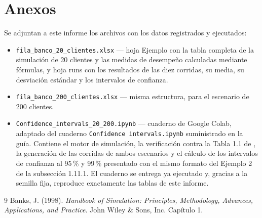 \documentclass[11pt,letterpaper]{article}
\begin{document}
\section{Anexos}

Se adjuntan a este informe los archivos con los datos registrados y ejecutados:

\begin{itemize}[itemsep=3pt]
    \item \texttt{fila\_banco\_20\_clientes.xlsx} --- hoja \guillemotleft Ejemplo\guillemotright{} con la tabla completa de la simulación de 20 clientes y las medidas de desempeño calculadas mediante fórmulas, y hoja  runs\guillemotright{} con los resultados de las diez corridas, su media, su desviación estándar y los intervalos de confianza.
    \item \texttt{fila\_banco\_200\_clientes.xlsx} --- misma estructura, para el escenario de 200 clientes.
    \item \texttt{Confidence\_intervals\_20\_200.ipynb} --- cuaderno de Google Colab, adaptado del cuaderno \texttt{Confidence intervals.ipynb} suministrado en la guía. Contiene el motor de simulación, la verificación contra la Tabla 1.1 de \cite{Banks1998}, la generación de las corridas de ambos escenarios y el cálculo de los intervalos de confianza al 95\,\% y 99\,\% presentado con el mismo formato del Ejemplo 2 de la subsección 1.11.1. El cuaderno se entrega ya ejecutado y, gracias a la semilla fija, reproduce exactamente las tablas de este informe.
\end{itemize}

\begin{thebibliography}{9}
Banks, J. (1998). \emph{Handbook of Simulation: Principles, Methodology, Advances, Applications, and Practice}. John Wiley \& Sons, Inc. Capítulo 1.
\end{thebibliography}
\end{document}
